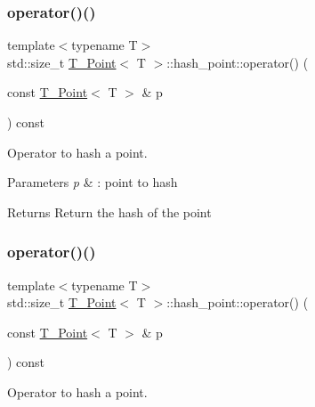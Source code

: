 \subsubsection{\texorpdfstring{operator()()}{operator()()}\hspace{0.1cm}{\footnotesize\ttfamily [1/4]}}
{\footnotesize\ttfamily template$<$typename T$>$ \\
std\+::size\+\_\+t \hyperlink{classT__Point}{T\+\_\+\+Point}$<$ T $>$\+::hash\+\_\+point\+::operator() (\begin{DoxyParamCaption}\item[{const \hyperlink{classT__Point}{T\+\_\+\+Point}$<$ T $>$ \&}]{p }\end{DoxyParamCaption}) const\hspace{0.3cm}{\ttfamily [inline]}}



Operator to hash a point. 


\begin{DoxyParams}{Parameters}
{\em p} & \+: point to hash \\
\hline
\end{DoxyParams}
\begin{DoxyReturn}{Returns}
Return the hash of the point 
\end{DoxyReturn}
\mbox{\label{structT__Point_1_1hash__point_a6d41490eb7af074b029db524a80e2e53}} 
\subsubsection{\texorpdfstring{operator()()}{operator()()}\hspace{0.1cm}{\footnotesize\ttfamily [2/4]}}
{\footnotesize\ttfamily template$<$typename T$>$ \\
std\+::size\+\_\+t \hyperlink{classT__Point}{T\+\_\+\+Point}$<$ T $>$\+::hash\+\_\+point\+::operator() (\begin{DoxyParamCaption}\item[{const \hyperlink{classT__Point}{T\+\_\+\+Point}$<$ T $>$ \&}]{p }\end{DoxyParamCaption}) const\hspace{0.3cm}{\ttfamily [inline]}}



Operator to hash a point. 


